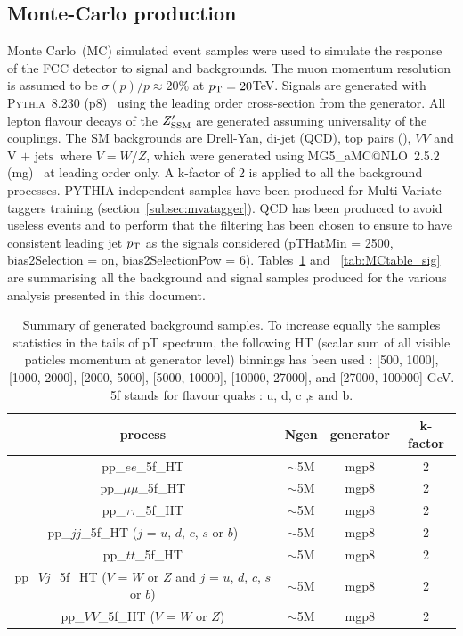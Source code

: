 \documentclass{cernrep}
\newcommand*{\vj}{\ensuremath{\text{V + jets}}}
\begin{document}
\subsection{Monte-Carlo production}
\label{subsec:mcprod}

Monte Carlo~(MC) simulated event samples were used to simulate the response of the FCC detector to signal and backgrounds. The muon momentum resolution is assumed to be $\sigma(p)/p \approx 20\%$ at $p_{\text{T}}= 20 $TeV. Signals are generated with {\scshape Pythia}~8.230 (p8)~\cite{Sjostrand:2014zea} using the leading order cross-section from the generator.
All lepton flavour decays of the $Z^{\prime}_{\mathrm{SSM}}$ are generated assuming universality of the couplings.
The SM backgrounds are Drell-Yan, di-jet (QCD), top pairs (\ttbar), $VV$ and \vj\ where $V=W/Z$, which were generated using {\scshape MG5\_}a{\scshape MC@NLO}~2.5.2 (mg)~\cite{Alwall:2014} at leading order only. A k-factor of 2 is applied to all the background processes. \newline
PYTHIA independent samples have been produced for Multi-Variate taggers training (section~\ref{subsec:mvatagger}). QCD has been produced to avoid useless events and to perform that the filtering has been chosen to ensure to have consistent leading jet $p\sb{\scriptstyle\mathrm{T}}$ as the signals considered (pTHatMin = 2500, bias2Selection = on, bias2SelectionPow = 6).\newline
Tables~\ref{tab:MCtable_bkgd} and ~\ref{tab:MCtable_sig} are summarising all the background and signal samples produced for the various analysis presented in this document.

\begin{table}[!htb]\centering
\begin{tabular}{|c|c|c|c|}
\hline
\hline		
process & Ngen & generator & k-factor \\
\hline		
pp\_$ee$\_5f\_HT & $\sim$5M & mgp8 & 2 \\
pp\_$\mu\mu$\_5f\_HT & $\sim$5M & mgp8 & 2 \\
pp\_$\tau\tau$\_5f\_HT & $\sim$5M & mgp8 & 2 \\
pp\_$jj$\_5f\_HT ($j$ = $u$, $d$, $c$, $s$ or $b$) & $\sim$5M & mgp8 & 2 \\
pp\_$tt$\_5f\_HT & $\sim$5M & mgp8 & 2 \\
pp\_$Vj$\_5f\_HT ($V$ = $W$ or $Z$ and $j$ = $u$, $d$, $c$, $s$ or $b$) & $\sim$5M & mgp8 & 2 \\
pp\_$VV$\_5f\_HT ($V$ = $W$ or $Z$) & $\sim$5M & mgp8 & 2 \\
\hline
\hline
\end{tabular}
\caption{Summary of generated background samples. To increase equally the samples statistics in the tails of pT spectrum, the following HT (scalar sum of all visible paticles momentum at generator level) binnings has been used : [500, 1000], [1000, 2000], [2000, 5000], [5000, 10000], [10000, 27000], and [27000, 100000] GeV. 5f stands for flavour quaks : u, d, c ,s  and b.}
\label{tab:MCtable_bkgd}
\end{table}
\end{document}
